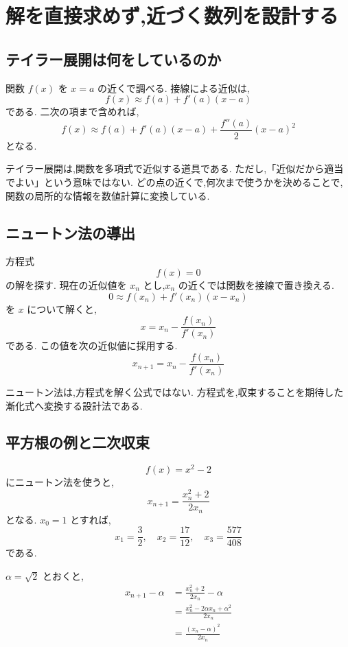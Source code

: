 
\section{解を直接求めず,近づく数列を設計する}

\subsection{テイラー展開は何をしているのか}

関数 $f(x)$ を $x=a$ の近くで調べる.
接線による近似は,
\[
  f(x)\approx f(a)+f'(a)(x-a)
\]
である.
二次の項まで含めれば,
\[
  f(x)
  \approx f(a)+f'(a)(x-a)
  +\frac{f''(a)}{2}(x-a)^2
\]
となる.

テイラー展開は,関数を多項式で近似する道具である.
ただし,「近似だから適当でよい」という意味ではない.
どの点の近くで,何次まで使うかを決めることで,関数の局所的な情報を数値計算に変換している.

\subsection{ニュートン法の導出}

方程式
\[
  f(x)=0
\]
の解を探す.
現在の近似値を $x_n$ とし,$x_n$ の近くでは関数を接線で置き換える.
\[
  0\approx f(x_n)+f'(x_n)(x-x_n)
\]
を $x$ について解くと,
\[
  x=x_n-\frac{f(x_n)}{f'(x_n)}
\]
である.
この値を次の近似値に採用する.
\[
  x_{n+1}=x_n-\frac{f(x_n)}{f'(x_n)}
\]

ニュートン法は,方程式を解く公式ではない.
方程式を,収束することを期待した漸化式へ変換する設計法である.

\subsection{平方根の例と二次収束}

\[
  f(x)=x^2-2
\]
にニュートン法を使うと,
\[
  x_{n+1}=\frac{x_n^2+2}{2x_n}
\]
となる.
$x_0=1$ とすれば,
\[
  x_1=\frac32,\quad
  x_2=\frac{17}{12},\quad
  x_3=\frac{577}{408}
\]
である.

$\alpha=\sqrt2$ とおくと,
\[
  \begin{aligned}
    x_{n+1}-\alpha
     & =\frac{x_n^2+2}{2x_n}-\alpha             \\
     & =\frac{x_n^2-2\alpha x_n+\alpha^2}{2x_n} \\
     & =\frac{(x_n-\alpha)^2}{2x_n}
  \end{aligned}
\]

